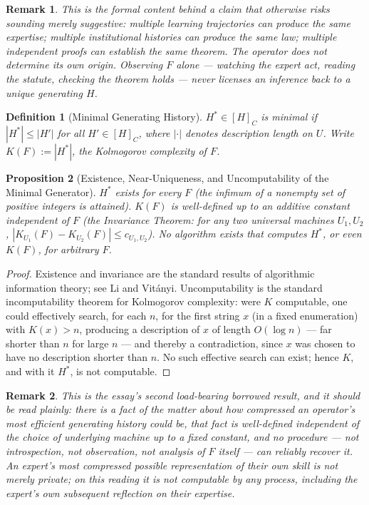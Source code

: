 \documentclass[11pt]{article}
\newtheorem{definition}{Definition}[section]
\newtheorem{proposition}[definition]{Proposition}
\newtheorem*{remark}{Remark}
\begin{document}
\begin{remark}
This is the formal content behind a claim that otherwise risks sounding merely suggestive: multiple learning trajectories can produce the same expertise; multiple institutional histories can produce the same law; multiple independent proofs can establish the same theorem. The operator does not determine its own origin. Observing $F$ alone — watching the expert act, reading the statute, checking the theorem holds — never licenses an inference back to a unique generating $H$.
\end{remark}

\begin{definition}[Minimal Generating History]
$H^* \in [H]_C$ is minimal if $|H^*| \leq |H'|$ for all $H'\in[H]_C$, where $|\cdot|$ denotes description length on $U$. Write $K(F) := |H^*|$, the Kolmogorov complexity of $F$.
\end{definition}

\begin{proposition}[Existence, Near-Uniqueness, and Uncomputability of the Minimal Generator]
\label{prop:kolmogorov}
$H^*$ exists for every $F$ (the infimum of a nonempty set of positive integers is attained). $K(F)$ is well-defined up to an additive constant independent of $F$ (the Invariance Theorem: for any two universal machines $U_1,U_2$, $|K_{U_1}(F) - K_{U_2}(F)|\leq c_{U_1,U_2}$). No algorithm exists that computes $H^*$, or even $K(F)$, for arbitrary $F$.
\end{proposition}

\begin{proof}
Existence and invariance are the standard results of algorithmic information theory; see Li and Vit\'anyi. Uncomputability is the standard incomputability theorem for Kolmogorov complexity: were $K$ computable, one could effectively search, for each $n$, for the first string $x$ (in a fixed enumeration) with $K(x) > n$, producing a description of $x$ of length $O(\log n)$ — far shorter than $n$ for large $n$ — and thereby a contradiction, since $x$ was chosen to have no description shorter than $n$. No such effective search can exist; hence $K$, and with it $H^*$, is not computable.
\end{proof}

\begin{remark}
This is the essay's second load-bearing borrowed result, and it should be read plainly: there is a fact of the matter about how compressed an operator's most efficient generating history could be, that fact is well-defined independent of the choice of underlying machine up to a fixed constant, and no procedure — not introspection, not observation, not analysis of $F$ itself — can reliably recover it. An expert's most compressed possible representation of their own skill is not merely private; on this reading it is not computable by any process, including the expert's own subsequent reflection on their expertise.
\end{remark}
\end{document}
